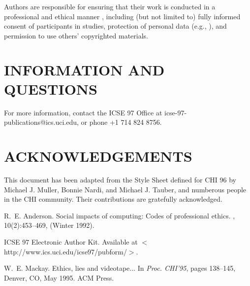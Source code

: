 Authors are responsible for ensuring that their work is 
conducted in a professional and ethical manner \cite{Anderson:Impacts}, 
including (but not limited to) fully informed consent of 
participants in studies, protection of personal data 
(e.g., \cite{Mackay:Ethics}), 
and permission to use others' copyrighted materials.

\section{INFORMATION AND QUESTIONS}

For more information, contact the ICSE 97 Office at 
icse-97-publications@ics.uci.edu, or phone +1 714 824 8756.

\section{ACKNOWLEDGEMENTS}
This document has been adapted from the Style Sheet 
defined for CHI 96 by Michael J. Muller, Bonnie Nardi, and 
Michael J. Tauber, and numberous people in the CHI 
community. Their contributions are gratefully acknowledged.



\begin{thebibliography}{1}

R.~E. Anderson.
\newblock Social impacts of computing: {C}odes of professional ethics.
, 10(2):453--469, (Winter 1992).

ICSE 97 {E}lectronic {A}uthor {K}it. {A}vailable at
  $<$http://www.ics.uci.edu/icse97/pubform/$>$.

W.~E. Mackay.
\newblock Ethics, lies and videotape...
\newblock In {\em Proc. CHI'95}, pages 138--145, Denver, CO, May 1995. ACM
  Press.

\end{thebibliography}

